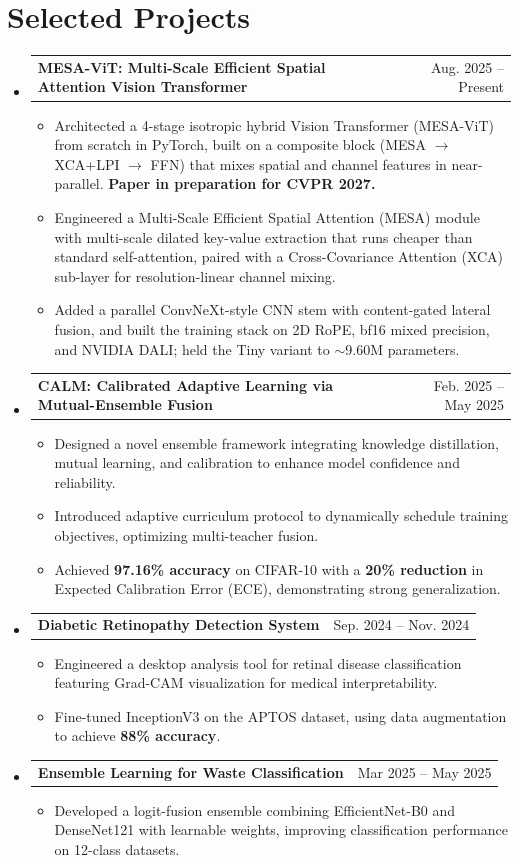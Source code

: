 \documentclass[letterpaper,11pt]{article}
\makeatletter
\newcommand{\resumeItem}[1]{
  \item\small{
    {#1 \vspace{-2pt}}
  }
}
\newcommand{\resumeProjectHeading}[2]{
    \item
    \begin{tabular*}{0.97\textwidth}{l@{\extracolsep{\fill}}r}
      \small#1 & #2 \\
    \end{tabular*}\vspace{-7pt}
}
\newcommand{\resumeSubHeadingListStart}{\begin{itemize}[leftmargin=0.15in, label={}]}
\newcommand{\resumeSubHeadingListEnd}{\end{itemize}}
\newcommand{\resumeItemListStart}{\begin{itemize}}
\newcommand{\resumeItemListEnd}{\end{itemize}\vspace{-5pt}}
\makeatother
\begin{document}
\section{\textbf{Selected Projects}}
  \resumeSubHeadingListStart
\resumeProjectHeading
      {\textbf{MESA-ViT: Multi-Scale Efficient Spatial Attention Vision Transformer}}{Aug. 2025 -- Present}
      \resumeItemListStart
        \resumeItem{Architected a 4-stage isotropic hybrid Vision Transformer (MESA-ViT) from scratch in PyTorch, built on a composite block (MESA $\rightarrow$ XCA+LPI $\rightarrow$ FFN) that mixes spatial and channel features in near-parallel. \textbf{Paper in preparation for CVPR 2027.}}
        \resumeItem{Engineered a Multi-Scale Efficient Spatial Attention (MESA) module with multi-scale dilated key-value extraction that runs cheaper than standard self-attention, paired with a Cross-Covariance Attention (XCA) sub-layer for resolution-linear channel mixing.}
        \resumeItem{Added a parallel ConvNeXt-style CNN stem with content-gated lateral fusion, and built the training stack on 2D RoPE, bf16 mixed precision, and NVIDIA DALI; held the Tiny variant to $\sim$9.60M parameters.}
      \resumeItemListEnd
      \vspace{-1ex}
    \resumeProjectHeading
      {\textbf{CALM: Calibrated Adaptive Learning via Mutual-Ensemble Fusion}}{Feb. 2025 -- May 2025}
      \resumeItemListStart
        \resumeItem{Designed a novel ensemble framework integrating knowledge distillation, mutual learning, and calibration to enhance model confidence and reliability.}
        \resumeItem{Introduced adaptive curriculum protocol to dynamically schedule training objectives, optimizing multi-teacher fusion.}
        \resumeItem{Achieved \textbf{97.16\% accuracy} on CIFAR-10 with a \textbf{20\% reduction} in Expected Calibration Error (ECE), demonstrating strong generalization.}
      \resumeItemListEnd
      \vspace{-1ex}
    \resumeProjectHeading
      {\textbf{Diabetic Retinopathy Detection System}}{Sep. 2024 -- Nov. 2024}
      \resumeItemListStart
        \resumeItem{Engineered a desktop analysis tool for retinal disease classification featuring Grad-CAM visualization for medical interpretability.}
        \resumeItem{Fine-tuned InceptionV3 on the APTOS dataset, using data augmentation to achieve \textbf{88\% accuracy}.}
      \resumeItemListEnd
      \vspace{-1ex}
  \resumeProjectHeading{\textbf{Ensemble Learning for Waste Classification}}{Mar 2025 -- May 2025}
  \resumeItemListStart
    \resumeItem{Developed a logit-fusion ensemble combining EfficientNet-B0 and DenseNet121 with learnable weights, improving classification performance on 12-class datasets.}
  \resumeItemListEnd
  \vspace{-1ex}
  \resumeSubHeadingListEnd
\vspace{-3ex}
\end{document}
